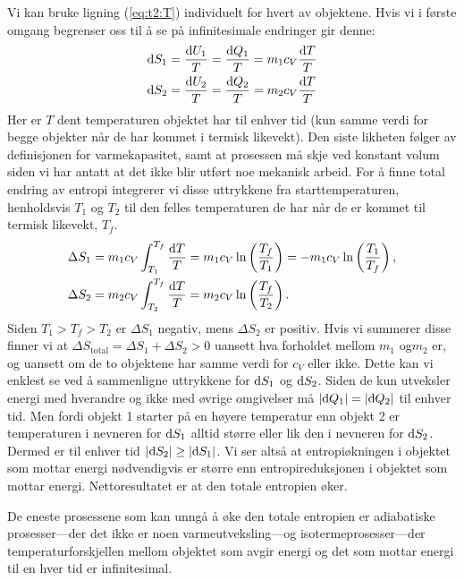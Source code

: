 Vi kan bruke ligning (\ref{eq:t2:T}) individuelt for hvert av objektene. Hvis vi i første omgang begrenser oss til å se på infinitesimale endringer gir denne:
\begin{align*}
	\text{d} S_1 &= \frac{\text{d} U_1}{T} = \frac{\text{d} Q_1}{T} = m_1c_V\frac{\text{d} T}{T}\\
	\text{d} S_2 &= \frac{\text{d} U_2}{T} = \frac{\text{d} Q_2}{ T}= m_2c_V\frac{\text{d} T}{T} \\
\end{align*}
Her er $T$ dent temperaturen objektet har til enhver tid (kun samme verdi for begge objekter når de har kommet i termisk likevekt). Den siste likheten følger av definisjonen for varmekapasitet, samt at prosessen må skje ved konstant volum siden vi har antatt at det ikke blir utført noe mekanisk arbeid. For å finne total endring av entropi integrerer vi disse uttrykkene fra starttemperaturen, henholdsvis $T_1$ og $T_2$ til den felles temperaturen de har når de er kommet til termisk likevekt, $T_f$. 
\begin{align*}
	\Delta S_1 &= m_1c_V\int_{T_1}^{T_f} \frac{\text{d} T}{T} = m_1c_V\ln\left(\frac{T_f}{T_1}\right) = - m_1c_V\ln\left(\frac{T_1}{T_f}\right), \\
	\Delta S_2 &= m_2c_V\int_{T_2}^{T_f} \frac{\text{d} T}{T} = m_2c_V\ln\left(\frac{T_f}{T_2}\right).
\end{align*}
Siden $T_1 > T_f > T_2$ er $\Delta S_1$ negativ, mens $\Delta S_2$ er positiv. Hvis vi summerer disse finner vi at $\Delta S_\text{total} = \Delta S_1 + \Delta S_2>0$ uansett hva forholdet mellom $m_1$ og$m_2$ er, og uansett om de to objektene har samme verdi for $c_V$ eller ikke. Dette kan vi enklest se ved å sammenligne uttrykkene for $\text{d} S_1$ og $\text{d} S_2$. Siden de kun utveksler energi med hverandre og ikke med øvrige omgivelser må $|\text{d} Q_1| = |\text{d} Q_2|$ til enhver tid. Men fordi objekt 1 starter på en høyere temperatur enn objekt 2 er temperaturen i nevneren for $\text{d} S_1$ alltid større eller lik den i nevneren for $\text{d} S_2$. Dermed er til enhver tid $|\text{d} S_2|\geq |\text{d} S_1|$. Vi ser altså at entropiøkningen i objektet som mottar energi nødvendigvis er større enn entropireduksjonen i objektet som mottar energi. Nettoresultatet er at den totale entropien øker.

 De eneste prosessene som kan unngå å øke den totale entropien er adiabatiske prosesser---der det ikke er noen varmeutveksling---og isotermeprosesser---der temperaturforskjellen mellom objektet som avgir energi og det som mottar energi til en hver tid er infinitesimal.
 
